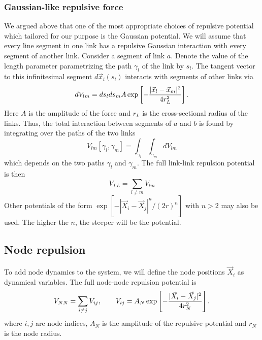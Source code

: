 \documentclass[nofootinbib,preprint,floatfix,titlepage,superscriptaddress]{revtex4} %
\begin{document}
\subsubsection{Gaussian-like repulsive force}
We argued above
that one of the most appropriate choices of repulsive potential which tailored for our purpose is the Gaussian potential. 
We will assume that every line segment in one link has a repulsive Gaussian interaction with every segment of another link. Consider a segment of link $a$. Denote the value of the length parameter parametrizing the path $\gamma_l$ of the link by $s_l$. The tangent vector to this infinitesimal segment $d\vec{x}_l(s_l)$ interacts with segments of other links via
\begin{equation}
dV_{lm} = %
ds_lds_m
A \exp\left[- {|\vec{x}_l-\vec{x}_m|^2 \over 4 r_L^2}\right]\label{eq:dVij}.
\end{equation}
Here $A$ is the amplitude of the force and $r_L$ is the cross-sectional radius of the links.
Thus, the total interaction between segments of $a$ and $b$ is found by integrating over the paths of the two links
\begin{equation}
V_{lm}[\gamma_l,\gamma_m] = \int_{\gamma_l} \int_{\gamma_m} dV_{lm} \label{eq:Vij}
\end{equation}
which depends on the two paths $\gamma_l$ and $\gamma_m$.  
The full link-link repulsion potential is then
\begin{equation}
    V_{LL} = \sum_{l\ne m} V_{lm}
\end{equation}
Other potentials of the form $\exp[-|\vec{X}_i-\vec{X}_j|^n/(2r)^n]$ with $n>2$ may also be used. 
The higher the $n$, the steeper will be the potential. 


\subsection{Node repulsion}

To add node dynamics to the system, we will define the node positions $\vec{X}_i$ as dynamical variables. 
The full node-node repulsion potential is \begin{equation}
V_{NN} = \sum_{i\ne j }V_{ij},\qquad  V_{ij} = %
A_N \exp\left[- {|\vec{X}_i-\vec{X}_j|^2 \over 4 r_N^2}\right]\label{eq:VIJ0}.
\end{equation}
where $i,j$ are node indices, $A_N$ is the amplitude of the repulsive potential and $r_N$ is the node radius. 
\end{document}
